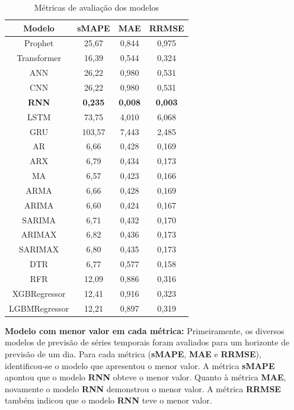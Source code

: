 \begin{table}[!htb]
	\centering
	\caption{Métricas de avaliação dos modelos}
	\label{tab:metrics}
	\small
	
	\begin{tabular}{cccc}
		\hline
		
		\textbf{Modelo} & \textbf{sMAPE} & \textbf{MAE} & \textbf{RRMSE} \\
		\hline
		Prophet & 25,67 & 0,844 & 0,975 \\
		Transformer & 16,39 & 0,544 & 0,324 \\
		ANN & 26,22 & 0,980 & 0,531 \\
		CNN & 26,22 & 0,980 & 0,531 \\
		\textbf{RNN} & \textbf{0,235} & \textbf{0,008} & \textbf{0,003} \\
		LSTM & 73,75 & 4,010 & 6,068 \\
		GRU & 103,57 & 7,443 & 2,485 \\
		AR & 6,66 & 0,428 & 0,169 \\
		ARX & 6,79 & 0,434 & 0,173 \\
		MA & 6,57 & 0,423 & 0,166 \\
		ARMA & 6,66 & 0,428 & 0,169 \\
		ARIMA & 6,60 & 0,424 & 0,167 \\
		SARIMA & 6,71 & 0,432 & 0,170 \\
		ARIMAX & 6,82 & 0,436 & 0,173 \\
		SARIMAX & 6,80 & 0,435 & 0,173 \\
		DTR & 6,77 & 0,577 & 0,158 \\
		RFR & 12,09 & 0,886 & 0,316 \\
		XGBRegressor & 12,41 & 0,916 & 0,323 \\
		LGBMRegressor & 12,21 & 0,897 & 0,319 \\
		\hline
	\end{tabular}
\end{table}




\noindent\textbf{Modelo com menor valor em cada métrica:}	
Primeiramente, os diversos modelos de previsão de séries temporais foram avaliados para um horizonte de previsão de um dia. Para cada métrica (\textbf{sMAPE}, \textbf{MAE} e \textbf{RRMSE}), identificou-se o modelo que apresentou o menor valor.
A métrica \textbf{sMAPE} apontou que o modelo \textbf{RNN} obteve o menor valor.
Quanto à métrica \textbf{MAE}, novamente o modelo \textbf{RNN} demonstrou o menor valor.
A métrica \textbf{RRMSE} também indicou que o modelo \textbf{RNN} teve o menor valor.



